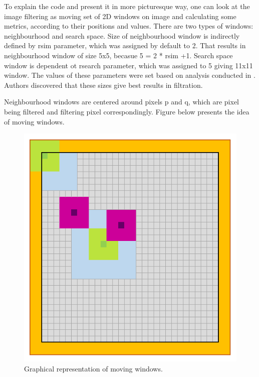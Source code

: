 To explain the code and present it in more picturesque way, one can look at the image filtering as moving set of
2D windows on image and calculating some metrics, according to their positions and values. There are two types of windows: neighbourhood and search space. Size of neighbourhood window is indirectly defined by rsim parameter, which was assigned by default to 2. That results in neighbourhood window of size 5x5, becasue 5 = 2 * rsim +1. Search space window is dependent ot rsearch parameter, which was assigned to 5 giving 11x11 window. The values of these parameters were set based on analysis conducted in \cite{5a1}. Authors discovered that these sizes give best results in filtration.

Neighbourhood windows are centered around pixels p and q, which are pixel being filtered and filtering pixel correspondingly. Figure below presents the idea of moving windows.

\begin{figure}[H]
	\centering{}
	\includegraphics[scale=0.7]{figures/module05/m5windows}
	\caption{Graphical representation of moving windows.} 
\end{figure}

